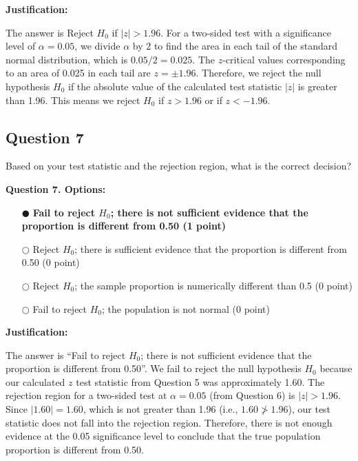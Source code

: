 \documentclass[12pt]{article}
\newcommand{\questionsep}{\vspace{1em}}
\begin{document}
\medskip\noindent\textbf{Justification:}

The answer is Reject $H_0$ if $|z| > 1.96$. For a two-sided test with a significance level of $\alpha = 0.05$, we divide $\alpha$ by 2 to find the area in each tail of the standard normal distribution, which is $0.05 / 2 = 0.025$. The $z$-critical values corresponding to an area of 0.025 in each tail are $z = \pm 1.96$. Therefore, we reject the null hypothesis $H_0$ if the absolute value of the calculated test statistic $|z|$ is greater than 1.96. This means we reject $H_0$ if $z > 1.96$ or if $z < -1.96$.
\questionsep

\subsection*{Question 7 }
Based on your test statistic and the rejection region, what is the correct decision?

\medskip\noindent\textbf{Question 7. Options:}
\begin{itemize}[leftmargin=2em, labelsep=0.5em, itemsep=0.3em, topsep=0.3em]
    \item[$\mdlgblkcircle$] \textbf{Fail to reject $H_0$; there is not sufficient evidence that the proportion is different from 0.50 (1 point)}
    \item[$\bigcirc$] Reject $H_0$; there is sufficient evidence that the proportion is different from 0.50 (0 point)
    \item[$\bigcirc$] Reject $H_0$; the sample proportion is numerically different than 0.5 (0 point)
    \item[$\bigcirc$] Fail to reject $H_0$; the population is not normal (0 point)
\end{itemize}

\medskip\noindent\textbf{Justification:}

The answer is “Fail to reject $H_0$; there is not sufficient evidence that the proportion is different from 0.50”. We fail to reject the null hypothesis $H_0$ because our calculated $z$ test statistic from Question 5 was approximately 1.60. The rejection region for a two-sided test at $\alpha = 0.05$ (from Question 6) is $|z| > 1.96$. Since $|1.60| = 1.60$, which is not greater than 1.96 (i.e., $1.60 \not> 1.96$), our test statistic does not fall into the rejection region. Therefore, there is not enough evidence at the 0.05 significance level to conclude that the true population proportion is different from 0.50.
\questionsep
\end{document}
